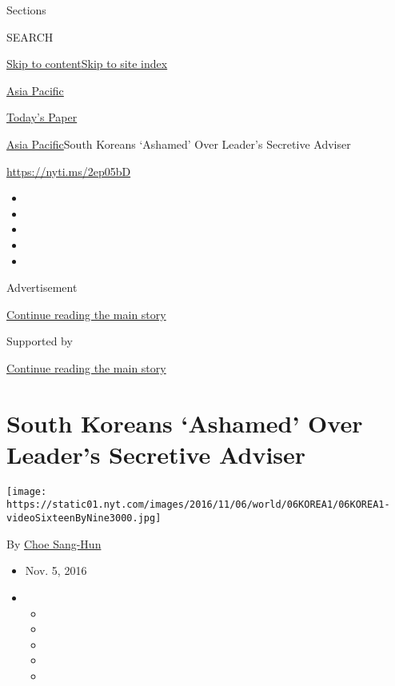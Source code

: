 Sections

SEARCH

\protect\hyperlink{site-content}{Skip to
content}\protect\hyperlink{site-index}{Skip to site index}

\href{https://www.nytimes.com/section/world/asia}{Asia Pacific}

\href{https://myaccount.nytimes.com/auth/login?response_type=cookie\&client_id=vi}{}

\href{https://www.nytimes.com/section/todayspaper}{Today's Paper}

\href{/section/world/asia}{Asia Pacific}\textbar{}South Koreans
`Ashamed' Over Leader's Secretive Adviser

\url{https://nyti.ms/2ep05bD}

\begin{itemize}
\item
\item
\item
\item
\item
\end{itemize}

Advertisement

\protect\hyperlink{after-top}{Continue reading the main story}

Supported by

\protect\hyperlink{after-sponsor}{Continue reading the main story}

\hypertarget{south-koreans-ashamed-over-leaders-secretive-adviser}{%
\section{South Koreans `Ashamed' Over Leader's Secretive
Adviser}\label{south-koreans-ashamed-over-leaders-secretive-adviser}}

\texttt{[image: https://static01.nyt.com/images/2016/11/06/world/06KOREA1/06KOREA1-videoSixteenByNine3000.jpg]}

By \href{http://www.nytimes.com/by/choe-sang-hun}{Choe Sang-Hun}

\begin{itemize}
\item
  Nov. 5, 2016
\item
  \begin{itemize}
  \item
  \item
  \item
  \item
  \item
  \end{itemize}
\end{itemize}

